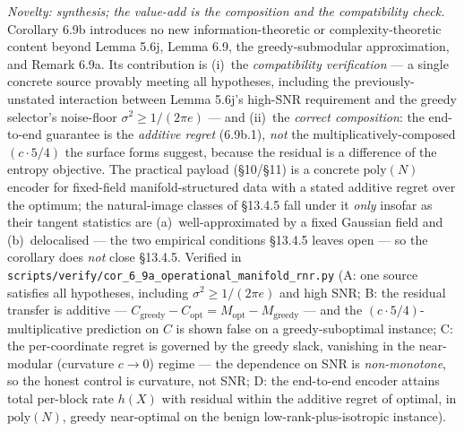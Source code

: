 \documentclass[
]{article}
\begin{document}
\emph{Novelty: synthesis; the value-add is the composition and the
compatibility check.} Corollary 6.9b introduces no new information-theoretic or
complexity-theoretic content beyond Lemma 5.6j, Lemma 6.9, the greedy-submodular
approximation, and Remark 6.9a. Its contribution is (i)~the \emph{compatibility
verification} --- a single concrete source provably meeting all hypotheses,
including the previously-unstated interaction between Lemma 5.6j's high-SNR
requirement and the greedy selector's noise-floor $\sigma^2\ge1/(2\pi e)$ ---
and (ii)~the \emph{correct composition}: the end-to-end guarantee is the
\emph{additive regret} (6.9b.1), \emph{not} the multiplicatively-composed
$(c\cdot 5/4)$ the surface forms suggest, because the residual is a difference of
the entropy objective. The practical payload (\S 10/\S 11) is a concrete
$\mathrm{poly}(N)$ encoder for fixed-field manifold-structured data with a stated
additive regret over the optimum; the natural-image classes of \S 13.4.5 fall
under it \emph{only} insofar as their tangent statistics are (a)~well-approximated
by a fixed Gaussian field and (b)~delocalised --- the two empirical conditions
\S 13.4.5 leaves open --- so the corollary does \emph{not} close \S 13.4.5.
Verified in \texttt{scripts/verify/cor\_6\_9a\_operational\_manifold\_rnr.py}
(A: one source satisfies all hypotheses, including $\sigma^2\ge 1/(2\pi e)$ and
high SNR; B: the residual transfer is additive ---
$C_{\mathrm{greedy}}-C_{\mathrm{opt}}=M_{\mathrm{opt}}-M_{\mathrm{greedy}}$ ---
and the $(c\cdot5/4)$-multiplicative prediction on $C$ is shown false on a
greedy-suboptimal instance; C: the per-coordinate regret is governed by the
greedy slack, vanishing in the near-modular (curvature $c\to0$) regime --- the
dependence on SNR is \emph{non-monotone}, so the honest control is curvature,
not SNR; D: the end-to-end encoder attains total per-block rate $h(X)$ with
residual within the additive regret of optimal, in $\mathrm{poly}(N)$, greedy
near-optimal on the benign low-rank-plus-isotropic instance).
\end{document}
